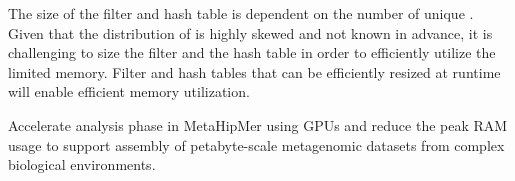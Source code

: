 The size of the filter and hash table is dependent on the number of unique \kmers. Given that the distribution of \kmers is highly skewed and not known in advance, it is challenging to size the filter and the hash table in order to efficiently utilize the limited memory. Filter and hash tables that can be efficiently resized at runtime will enable efficient memory utilization.


\begin{rproblem}
Accelerate \kmer analysis phase in MetaHipMer using GPUs and reduce the peak RAM usage to support assembly of petabyte-scale metagenomic datasets from complex biological environments.
\label{rprob:metahipmer}
\end{rproblem}
